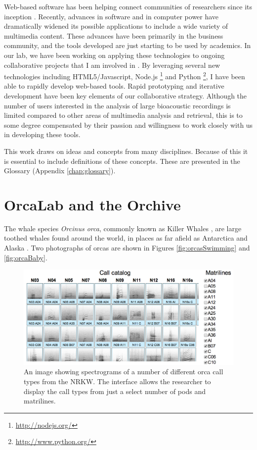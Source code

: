 \documentclass[12pt,oneside]{book}
\begin{document}
Web-based software has been helping connect communities of researchers
since its inception \cite{bernerslee1992www}.  Recently, advances in
software and in computer power have dramatically widened its possible
applications to include a wide variety of multimedia content.  These
advances have been primarily in the business community, and the tools
developed are just starting to be used by academics. In our lab, we
have been working on applying these technologies to ongoing
collaborative projects that I am involved in
\cite{ness2008chants}. By leveraging several new technologies
including HTML5/Javascript,
Node.js \footnote{\url{http://nodejs.org/}} and
Python \footnote{\url{http://www.python.org/}}, I have been able to
rapidly develop web-based tools.  Rapid prototyping and iterative
development have been key elements of our collaborative
strategy. Although the number of users interested in the analysis of
large bioacoustic recordings is limited compared to other areas of
multimedia analysis and retrieval, this is to some degree compensated
by their passion and willingness to work closely with us in developing
these tools.

This work draws on ideas and concepts from many disciplines.  Because
of this it is essential to include definitions of these concepts.
These are presented in the Glossary (Appendix \ref{chap:glossary}).

%
%
\section{OrcaLab and the Orchive}
\label{section:introduction:orchive}

The whale species \textit{Orcinus orca}, commonly known as Killer
Whales \cite{ford2000book}, are large toothed whales found around the
world, in places as far afield as Antarctica and Alaska
\cite{estes2009decline}.  Two photographs of orcas are shown in Figures
\ref{fig:orcasSwimming} and \ref{fig:orcaBaby}.

\begin{figure}[t]
\centering
\includegraphics[width=\columnwidth]{figures/orcaCallCatalog}
\caption{An image showing spectrograms of a number of different orca
  call types from the NRKW.  The interface
  allows the researcher to display the call types from just a select number
  of pods and matrilines.}
\label{fig:orcaCallCatalog}
\end{figure}
\end{document}

